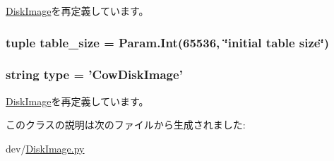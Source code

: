 \hyperlink{classDiskImage_1_1DiskImage_ac12001087117f0553e2d0bad6e2ab2bf}{DiskImage}を再定義しています。\hypertarget{classDiskImage_1_1CowDiskImage_ad67ffd2dbd3d2f980bf246ac3108800d}{
\subsubsection[{table\_\-size}]{\setlength{\rightskip}{0pt plus 5cm}tuple {\bf table\_\-size} = Param.Int(65536, \char`\"{}initial table size\char`\"{})}}
\label{classDiskImage_1_1CowDiskImage_ad67ffd2dbd3d2f980bf246ac3108800d}
\hypertarget{classDiskImage_1_1CowDiskImage_acce15679d830831b0bbe8ebc2a60b2ca}{
\subsubsection[{type}]{\setlength{\rightskip}{0pt plus 5cm}string {\bf type} = '{\bf CowDiskImage}'}}
\label{classDiskImage_1_1CowDiskImage_acce15679d830831b0bbe8ebc2a60b2ca}


\hyperlink{classDiskImage_1_1DiskImage_acce15679d830831b0bbe8ebc2a60b2ca}{DiskImage}を再定義しています。

このクラスの説明は次のファイルから生成されました:\begin{DoxyCompactItemize}
\item 
dev/\hyperlink{DiskImage_8py}{DiskImage.py}\end{DoxyCompactItemize}
